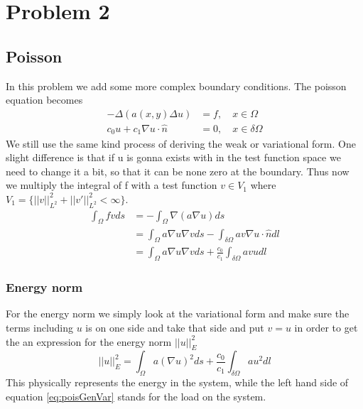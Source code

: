 \documentclass[11pt]{article}
\begin{document}
\section{Problem 2}
\subsection{Poisson}
In this problem we add some more complex boundary conditions. The poisson equation becomes 
\begin{align}
	-\Delta(a(x,y)\Delta u) &= f, \quad x\in\Omega \\
	c_0 u + c_1 \nabla u \cdot \hat{n} &= 0, \quad x \in\delta\Omega
\end{align}
We still use the same kind process of deriving the weak or variational form. One slight difference is that if u is gonna exists with in the test function space we need to change it a bit, so that it can be none zero at the boundary. Thus now we multiply the integral of f with a test function $v\in V_1$ where $V_1 = \{||v||^2_{L^2} + ||v'||^2_{L^2} < \infty\}$.
\begin{align}
	\int_{\Omega} f v ds &= - \int_{\Omega} \nabla (a\nabla u) ds \label{eq:poisGenVar}\\
	&= \int_{\Omega} a \nabla u \nabla v ds - \int_{\delta \Omega}a v \nabla u \cdot \hat{n} dl \\
	& = \int_{\Omega} a \nabla u \nabla v ds + \frac{c_0}{c_1}  \int_{\delta \Omega} a v u dl
\end{align}

\subsubsection{Energy norm}
For the energy norm we simply look at the variational form and make sure the terms including $u$ is on one side and take that side and put $v=u$ in order to get the an expression for the energy norm $||u||^2_E$
\begin{equation}
	||u||^2_E = \int_{\Omega} a (\nabla u)^2 ds + \frac{c_0}{c_1}  \int_{\delta \Omega} a u^2 dl
\end{equation}
This physically represents the energy in the system, while the left hand side of equation \ref{eq:poisGenVar} stands for the load on the system.
\end{document}
